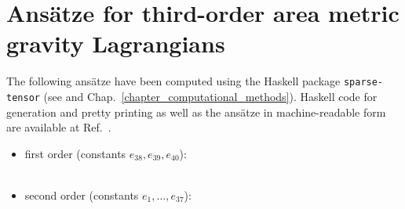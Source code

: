 \chapter{Ansätze for third-order area metric gravity Lagrangians}
\label{appendix_ansaetze}

The following ansätze have been computed using the Haskell package \texttt{sparse-tensor} (see \cite{Reinhart_2019_sparse-tensor} and Chap.~\ref{chapter_computational_methods}). Haskell code for generation and pretty printing as well as the ansätze in machine-readable form are available at Ref.\ \cite{Alex_2020_area-metric-gravity}.

\begin{itemize}
  \item first order (constants $e_{38},e_{39},e_{40}$): \\
   \\
\item second order (constants $e_{1},\dots,e_{37}$): \\
\end{itemize}
